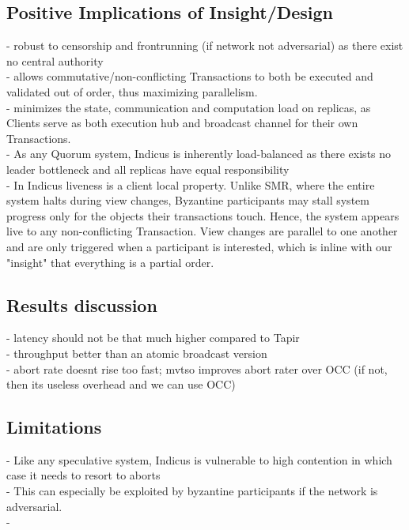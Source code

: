 \subsection{Positive Implications of Insight/Design}
- robust to censorship and frontrunning (if network not adversarial) as there exist no central authority \\
-  allows commutative/non-conflicting Transactions to both be executed and validated out of order, thus maximizing parallelism. \\
-  minimizes the state, communication and computation load on replicas, as Clients serve as both execution hub and broadcast channel for their own Transactions. \\
- As any Quorum system, Indicus is inherently load-balanced as there exists no leader bottleneck and all replicas have equal responsibility\\
- In Indicus liveness is a client local property. Unlike SMR, where the entire system halts during view changes, Byzantine participants may stall system progress only for the objects their transactions touch. Hence, the system appears live to any non-conflicting Transaction. View changes are parallel to one another and are only triggered when a participant is interested, which is inline with our "insight" that everything is a partial order.

\subsection{Results discussion}
- latency should not be that much higher compared to Tapir\\
- throughput better than an atomic broadcast version\\
- abort rate doesnt rise too fast; mvtso improves abort rater over OCC (if not, then its useless overhead and we can use OCC)


\subsection{Limitations}
 - Like any speculative system, Indicus is vulnerable to high contention in which case it needs to resort to aborts\\
 - This can especially be exploited by byzantine participants if the network is adversarial.\\
 - 

